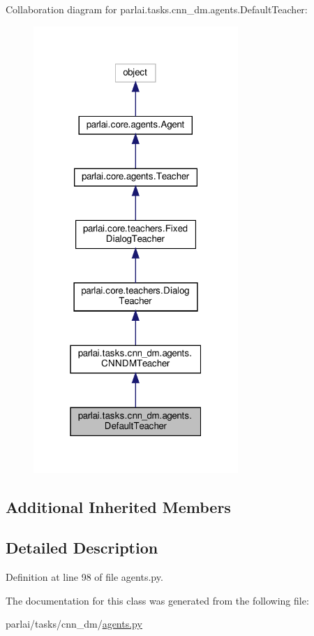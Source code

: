 Collaboration diagram for parlai.\+tasks.\+cnn\+\_\+dm.\+agents.\+Default\+Teacher\+:\nopagebreak
\begin{figure}[H]
\begin{center}
\leavevmode
\includegraphics[width=220pt]{de/db5/classparlai_1_1tasks_1_1cnn__dm_1_1agents_1_1DefaultTeacher__coll__graph}
\end{center}
\end{figure}
\subsection*{Additional Inherited Members}


\subsection{Detailed Description}


Definition at line 98 of file agents.\+py.



The documentation for this class was generated from the following file\+:\begin{DoxyCompactItemize}
\item 
parlai/tasks/cnn\+\_\+dm/\hyperlink{parlai_2tasks_2cnn__dm_2agents_8py}{agents.\+py}\end{DoxyCompactItemize}
